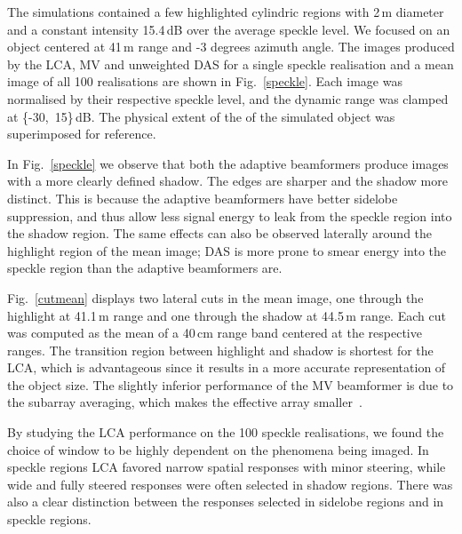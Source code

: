 \documentclass[10pt,journal,draftclsnofoot,onecolumn]{IEEEtran}
\newcommand\Fig[1]{Fig.~\ref{#1}}
\newcommand\1{\vec 1}
\begin{document}
The simulations contained a few highlighted cylindric regions with 2\,m diameter and a constant intensity 15.4\,dB over the average speckle level. We focused on an object centered at 41\,m range and -3 degrees azimuth angle. The images produced by the LCA, MV and unweighted DAS for a single speckle realisation and a mean image of all 100 realisations are shown in \Fig{speckle}. Each image was normalised by their respective speckle level, and the dynamic range was clamped at \{-30,~15\}\,dB. The physical extent of the of the simulated object was superimposed for reference. %

In \Fig{speckle} we observe that both the adaptive beamformers produce images with a more clearly defined shadow. The edges are sharper and the shadow more distinct. This is because the adaptive beamformers have better sidelobe suppression, and thus allow less signal energy to leak from the speckle region into the shadow region. The same effects can also be observed laterally around the highlight region of the mean image; DAS is more prone to smear energy into the speckle region than the adaptive beamformers are.

\Fig{cutmean} displays two lateral cuts in the mean image, one through the highlight at 41.1\,m range and one through the shadow at 44.5\,m range. Each cut was computed as the mean of a 40\,cm range band centered at the respective ranges. The transition region between highlight and shadow is shortest for the LCA, which is advantageous since it results in a more accurate representation of the object size. The slightly inferior performance of the MV beamformer is due to the subarray averaging, which makes the effective array smaller~\cite{syn07}.

By studying the LCA performance on the 100 speckle realisations, we found the choice of window to be highly dependent on the phenomena being imaged. In speckle regions LCA favored narrow spatial responses with minor steering, while wide and fully steered responses were often selected in shadow regions. There was also a clear distinction between the responses selected in sidelobe regions and in speckle regions.

\end{document}
